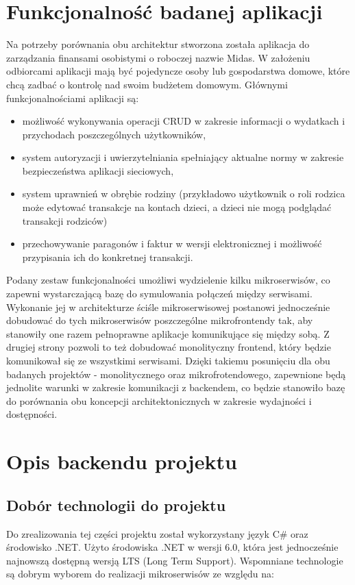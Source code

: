 \documentclass{SGGW-thesis}
\begin{document}
\chapter{Funkcjonalność badanej aplikacji}
Na potrzeby porównania obu architektur stworzona została aplikacja do zarządzania finansami osobistymi o roboczej nazwie Midas. W założeniu odbiorcami aplikacji mają być pojedyncze osoby lub gospodarstwa domowe, które chcą zadbać o kontrolę nad swoim budżetem domowym. Głównymi funkcjonalnościami aplikacji są:

  \begin{itemize}
    \item możliwość wykonywania operacji CRUD w zakresie informacji o wydatkach i przychodach poszczególnych użytkowników,
    \item system autoryzacji i uwierzytelniania spełniający aktualne normy w zakresie bezpieczeństwa aplikacji sieciowych,
    \item system uprawnień w obrębie rodziny (przykładowo użytkownik o roli rodzica może edytować transakcje na kontach dzieci, a dzieci nie mogą podglądać transakcji rodziców)
    \item przechowywanie paragonów i faktur w wersji elektronicznej i możliwość przypisania ich do konkretnej transakcji.
  \end{itemize}

Podany zestaw funkcjonalności umożliwi wydzielenie kilku mikroserwisów, co zapewni wystarczającą bazę do symulowania połączeń między serwisami. Wykonanie jej w architekturze ściśle mikroserwisowej postanowi jednocześnie dobudować do tych mikroserwisów poszczególne mikrofrontendy tak, aby stanowiły one razem pełnoprawne aplikacje komunikujące się między sobą. Z drugiej strony pozwoli to też dobudować monolityczny frontend, który będzie komunikował się ze wszystkimi serwisami. Dzięki takiemu posunięciu dla obu badanych projektów - monolitycznego oraz mikrofrotendowego, zapewnione będą jednolite warunki w zakresie komunikacji z backendem, co będzie stanowiło bazę do porównania obu koncepcji architektonicznych w zakresie wydajności i dostępności.

\chapter{Opis backendu projektu}
  \section{Dobór technologii do projektu}
  Do zrealizowania tej części projektu został wykorzystany język C\# oraz środowisko .NET. Użyto środowiska .NET w wersji 6.0, która jest jednocześnie najnowszą dostępną wersją LTS (Long Term Support). Wspomniane technologie są dobrym wyborem do realizacji mikroserwisów ze względu na:
  
\end{document}
